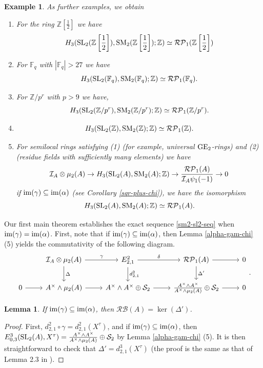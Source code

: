 \documentclass[11pt]{amsart}
\theoremstyle{definition}
\theoremstyle{plain}
\newtheorem{lem}[ntn]{Lemma}
\newtheorem{exm}[ntn]{Example}
\numberwithin{equation}{section}
\newcommand{\z}{\mathbb{Z}}
\newcommand{\F}{\mathbb{F}}
\newcommand{\II}{\mathcal{I}}
\newcommand{\RP}{\mathcal{RP}}
\newcommand{\RB}{\mathcal{RB}}
\renewcommand{\SS}{\mathcal{S}}
\renewcommand{\aa}{{A^\times}}
\newcommand{\half}{{\left[\frac{1}{2}\right]}}
\newcommand{\mth}[1]{\left[ \frac{1}{#1} \right]}
\newcommand{\GE}{{\rm GE}}
\newcommand{\SL}{\mathit{{\rm SL}}}
\newcommand{\SM}{\mathit{{\rm SM}}}
\newcommand{\im}{{\rm im}}
\begin{document}
\begin{exm}
    As further examples, we obtain
    \begin{enumerate}
        \item For the ring $\z\half$ we have
        \[
            H_3(\SL_2(\z\mth{2}),\SM_2(\z\mth{2});\z)\simeq \RP_1(\z\mth{2})
        \]
        \item For $\F_q$ with $|\F_q|>27$ we have
        \[
            H_3(\SL_2(\F_q),\SM_2(\F_q);\z)\simeq \RP_1(\F_q).
        \]
        \item For $\z/p^r$ with $p>9$ we have,
        \[
            H_3(\SL_2(\z/p^r),\SM_2(\z/p^r);\z)\simeq \RP_1(\z/p^r).
        \]
        \item \[
            H_3(\SL_2(\z),\SM_2(\z);\z)\simeq \RP_1(\z).
        \]
        \item For semilocal rings satisfying (1) (for example, universal $\GE_2$-rings) and (2) (residue fields with sufficiently many elements) we have
        \[
            \II_A\otimes\mu_2(A)\to H_3(\SL_2(A),\SM_2(A);\z)\to \frac{\RP_1(A)}{\II_A\psi_1(-1)}\to 0
        \]
        if $\im(\gamma)\subseteq\im(\alpha)$ (see Corollary \ref{sqr-plus-chi}), we have the isomorphism
        \[
            H_3(\SL_2(A),\SM_2(A);\z)\simeq \RP_1(A).
        \]
    \end{enumerate}
\end{exm}
Our first main theorem establishes the exact sequence \eqref{sm2-sl2-seq} when $\im(\gamma)=\im(\alpha)$. First, note that if $\im(\gamma)\subseteq\im(\alpha)$, then Lemma \ref{alpha-gam-chi} (5) yields the commutativity of the following diagram.
\begin{equation}
    \begin{tikzcd}
        & \II_A\otimes\mu_2(A)\ar[r,"\gamma"]\ar[d,"\Delta"] & E^2_{2,1}\ar[r,"\delta"]\ar[d,"d^2_{2,1}"] & \RP_1(A)\ar[r]\ar[d,"\Delta'"] & 0\\
        0\ar[r] & \aa\wedge\mu_2(A)\ar[r] & \aa\wedge\aa\oplus \SS_2\ar[r] & \frac{\aa\wedge\aa}{\aa\wedge\mu_2(A)}\oplus \SS_2\ar[r] & 0
    \end{tikzcd}.
\end{equation}
\begin{lem}\label{ker-rba}
    If $\im(\gamma)\subseteq\im(\alpha)$, then $\RB(A)=\ker(\Delta')$.
\end{lem}
\begin{proof}
    First, $d^2_{2,1}\circ\gamma=d^2_{2,1}(X^\tau)$, and if $\im(\gamma)\subseteq\im(\alpha)$, then $E^3_{0,3}(\SL_2(A),X^\tau)=\frac{\aa\wedge\aa}{\aa\wedge\mu_2(A)}\oplus\SS_2$ by Lemma \ref{alpha-gam-chi} (5). It is then straightforward to check that $\Delta'=d^3_{2,1}(X^\tau)$ (the proof is the same as that of Lemma 2.3 in \cite{B-E-2025}).
\end{proof}
\end{document}

